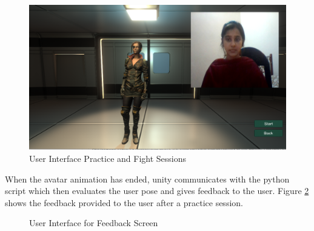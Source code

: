 \begin{figure}
  \centering
  \includegraphics[scale=0.5]{images/screens/practice.png} 
  \caption{User Interface Practice and Fight Sessions} 
  \label{fig:practiceAndFightSessions}
\end{figure}

When the avatar animation has ended, unity communicates with the python script which then evaluates the user pose and gives feedback to the user. Figure \ref{fig:feedbackScreen} shows the feedback provided to the user after a practice session.

\begin{figure}
  \centering
 \quad 
  \caption{User Interface for Feedback Screen} 
  \label{fig:feedbackScreen}
\end{figure}


